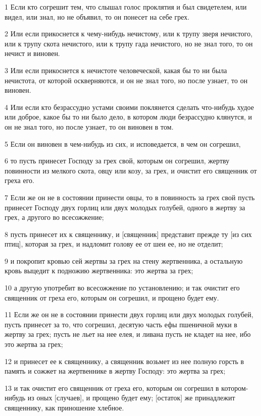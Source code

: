\par 1 Если кто согрешит тем, что слышал голос проклятия и был свидетелем, или видел, или знал, но не объявил, то он понесет на себе грех.
\par 2 Или если прикоснется к чему-нибудь нечистому, или к трупу зверя нечистого, или к трупу скота нечистого, или к трупу гада нечистого, но не знал того, то он нечист и виновен.
\par 3 Или если прикоснется к нечистоте человеческой, какая бы то ни была нечистота, от которой оскверняются, и он не знал того, но после узнает, то он виновен.
\par 4 Или если кто безрассудно устами своими поклянется сделать что-нибудь худое или доброе, какое бы то ни было дело, в котором люди безрассудно клянутся, и он не знал того, но после узнает, то он виновен в том.
\par 5 Если он виновен в чем-нибудь из сих, и исповедается, в чем он согрешил,
\par 6 то пусть принесет Господу за грех свой, которым он согрешил, жертву повинности из мелкого скота, овцу или козу, за грех, и очистит его священник от греха его.
\par 7 Если же он не в состоянии принести овцы, то в повинность за грех свой пусть принесет Господу двух горлиц или двух молодых голубей, одного в жертву за грех, а другого во всесожжение;
\par 8 пусть принесет их к священнику, и [священник] представит прежде ту [из сих птиц], которая за грех, и надломит голову ее от шеи ее, но не отделит;
\par 9 и покропит кровью сей жертвы за грех на стену жертвенника, а остальную кровь выцедит к подножию жертвенника: это жертва за грех;
\par 10 а другую употребит во всесожжение по установлению; и так очистит его священник от греха его, которым он согрешил, и прощено будет ему.
\par 11 Если же он не в состоянии принести двух горлиц или двух молодых голубей, пусть принесет за то, что согрешил, десятую часть ефы пшеничной муки в жертву за грех; пусть не льет на нее елея, и ливана пусть не кладет на нее, ибо это жертва за грех;
\par 12 и принесет ее к священнику, а священник возьмет из нее полную горсть в память и сожжет на жертвеннике в жертву Господу: это жертва за грех;
\par 13 и так очистит его священник от греха его, которым он согрешил в котором-нибудь из оных [случаев], и прощено будет ему; [остаток] же принадлежит священнику, как приношение хлебное.

